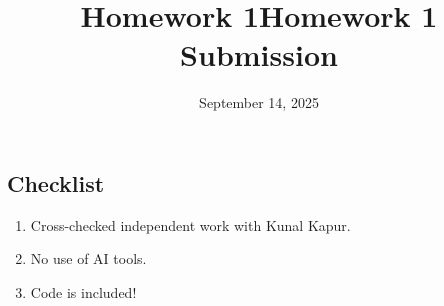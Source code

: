 \documentclass[]{exam}
\title{Homework 1}
\date{September 14, 2025}
\title{Homework 1 Submission}
\begin{document}
\maketitle

\hypertarget{problem-0-homework-checklist}{%
\subsection{Checklist}\label{problem-0-homework-checklist}}


\begin{enumerate}
	\item Cross-checked independent work with Kunal Kapur.
	\item No use of AI tools.
	\item Code is included!
\end{enumerate}
\end{document}
